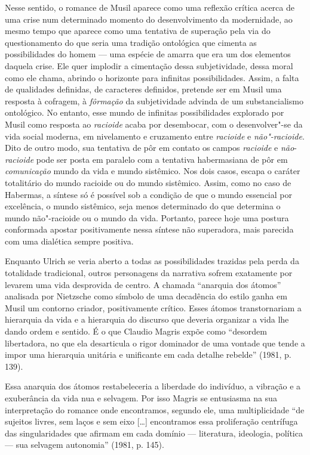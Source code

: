 Nesse sentido, o romance de Musil aparece como uma reflexão crítica
acerca de uma crise num determinado momento do desenvolvimento da
modernidade, ao mesmo tempo que aparece como uma tentativa de superação
pela via do questionamento do que seria uma tradição ontológica que
cimenta as possibilidades do homem --- uma espécie de amarra que era um
dos elementos daquela crise. Ele quer implodir a cimentação dessa
subjetividade, dessa moral como ele chama, abrindo o horizonte para
infinitas possibilidades. Assim, a falta de qualidades definidas, de
caracteres definidos, pretende ser em Musil uma resposta à cofragem, à
\emph{fôrmação} da subjetividade advinda de um substancialismo
ontológico. No entanto, esse mundo de infinitas possibilidades explorado
por Musil como resposta ao \emph{racioide} acaba por desembocar, com o
desenvolver"-se da vida social moderna, em nivelamento e cruzamento entre
\emph{racioide} e \emph{não"-racioide}. Dito de outro modo, sua tentativa
de pôr em contato os campos \emph{racioide} e \emph{não}-\emph{racioide}
pode ser posta em paralelo com a tentativa habermasiana de pôr em
\emph{comunicação} mundo da vida e mundo sistêmico. Nos dois casos,
escapa o caráter totalitário do mundo racioide ou do mundo sistêmico.
Assim, como no caso de Habermas, a síntese só é possível sob a condição
de que o mundo essencial por excelência, o mundo sistêmico, seja menos
determinado do que determina o mundo não"-racioide ou o mundo da vida.
Portanto, parece hoje uma postura conformada apostar positivamente nessa
síntese não superadora, mais parecida com uma dialética sempre positiva.

Enquanto Ulrich se veria aberto a todas as possibilidades trazidas pela
perda da totalidade tradicional, outros personagens da narrativa sofrem
exatamente por levarem uma vida desprovida de centro. A chamada
``anarquia dos átomos'' analisada por Nietzsche como símbolo de uma
decadência do estilo ganha em Musil um contorno criador, positivamente
crítico. Esses átomos transtornariam a hierarquia da vida e a hierarquia
do discurso que deveria organizar a vida lhe dando ordem e sentido. É o
que Claudio Magris expõe como ``desordem libertadora, no que ela
desarticula o rigor dominador de uma vontade que tende a impor uma
hierarquia unitária e unificante em cada detalhe rebelde'' (1981, p. 139).

Essa anarquia dos átomos restabeleceria a liberdade do indivíduo, a
vibração e a exuberância da vida nua e selvagem. Por isso Magris se
entusiasma na sua interpretação do romance onde encontramos, segundo
ele, uma multiplicidade ``de sujeitos livres, sem laços e sem eixo
[\ldots{}] encontramos essa proliferação centrífuga das
singularidades que afirmam em cada domínio --- literatura, ideologia,
política --- sua selvagem autonomia'' (1981, p. 145).

